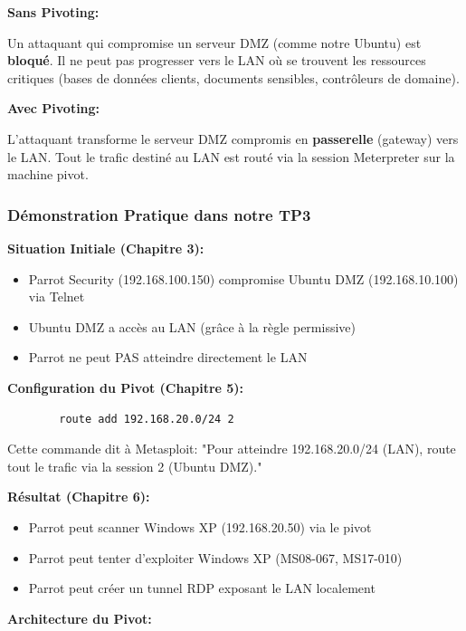 \documentclass[12pt,a4paper,openany]{report}
\begin{document}
	\textbf{Sans Pivoting:}
	
	Un attaquant qui compromise un serveur DMZ (comme notre Ubuntu) est 
	\textbf{bloqué}. Il ne peut pas progresser vers le LAN où se trouvent 
	les ressources critiques (bases de données clients, documents sensibles, 
	contrôleurs de domaine).
	
	\textbf{Avec Pivoting:}
	
	L'attaquant transforme le serveur DMZ compromis en \textbf{passerelle} 
	(gateway) vers le LAN. Tout le trafic destiné au LAN est routé via 
	la session Meterpreter sur la machine pivot.
	
	\subsubsection{Démonstration Pratique dans notre TP3}
	
	\textbf{Situation Initiale (Chapitre 3):}
	\begin{itemize}
		\item Parrot Security (192.168.100.150) compromise Ubuntu DMZ (192.168.10.100) via Telnet
		\item Ubuntu DMZ a accès au LAN (grâce à la règle permissive)
		\item Parrot ne peut PAS atteindre directement le LAN
	\end{itemize}
	
	\textbf{Configuration du Pivot (Chapitre 5):}
	\begin{lstlisting}
		route add 192.168.20.0/24 2
	\end{lstlisting}
	
	Cette commande dit à Metasploit: "Pour atteindre 192.168.20.0/24 (LAN), 
	route tout le trafic via la session 2 (Ubuntu DMZ)."
	
	\textbf{Résultat (Chapitre 6):}
	\begin{itemize}
		\item Parrot peut scanner Windows XP (192.168.20.50) via le pivot
		\item Parrot peut tenter d'exploiter Windows XP (MS08-067, MS17-010)
		\item Parrot peut créer un tunnel RDP exposant le LAN localement
	\end{itemize}
	
	\textbf{Architecture du Pivot:}
	
\end{document}
